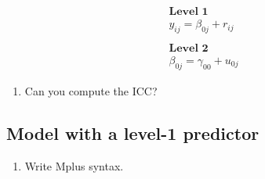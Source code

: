 \documentclass[
]{book}
\providecommand{\tightlist}{%
  \setlength{\itemsep}{0pt}\setlength{\parskip}{0pt}}
\begin{document}
\[
\begin{gathered}
\textbf{Level 1} \\ 
y_{ij}=\beta_{0j} + r_{ij} \\ \\
\textbf{Level 2} \\ 
\beta_{0j}=\gamma_{00} + u_{0j}
\end{gathered}
\]

\begin{enumerate}
\def\labelenumi{\arabic{enumi}.}
\setcounter{enumi}{3}
\tightlist
\item
  Can you compute the ICC?
\end{enumerate}

\subsection{Model with a level-1 predictor}\label{model-with-a-level-1-predictor}

\begin{enumerate}
\def\labelenumi{\arabic{enumi}.}
\tightlist
\item
  Write Mplus syntax.
\end{enumerate}
\end{document}
